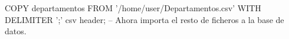 \lstset{caption=Ejemplo de COPY,label=sql:copy}
\begin{SQL}
COPY departamentos FROM '/home/user/Departamentos.csv' WITH DELIMITER ';' csv header;
-- Ahora importa el resto de ficheros a la base de datos.
\end{SQL}
